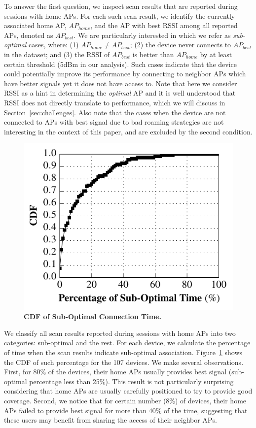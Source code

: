 To answer the first question, we inspect scan results that are reported during
\wifi{} sessions with home APs. For each such scan result, we identify the
currently associated home AP, $AP_{home}$, and the AP with best RSSI among all
reported APs, denoted as $AP_{best}$. We are particularly interested in which we
refer as \textit{sub-optimal} cases, where: (1) $AP_{home} \neq AP_{best}$; (2)
the device never connects to $AP_{best}$ in the dataset; and (3) the RSSI of
$AP_{best}$ is better than $AP_{home}$ by at least certain threshold (5dBm in
our analysis). Such cases indicate that the device could potentially improve its
\wifi{} performance by connecting to neighbor APs which have better signals yet it
does not have access to. Note that here we consider RSSI as a hint in determining the
\textit{optimal} AP and it is well understood that RSSI does not directly translate
to \wifi{} performance, which we will discuss in Section~\ref{sec:challenges}.
Also note that the cases when the device are not connected to APs with best
signal due to bad roaming strategies are not interesting in the context of this
paper, and are excluded by the second condition.

\begin{figure}[t]
  \centering
  \includegraphics[width=\columnwidth]{./figures/HomeAPSessionRSSI.pdf}
  \caption{\textbf{CDF of Sub-Optimal Connection Time.}}
  \label{fig:suboptimal}
\end{figure}

We classify all scan results reported during \wifi{} sessions with home APs into
two categories: sub-optimal and the rest. For each device, we calculate the
percentage of time when the scan results indicate sub-optimal association.
Figure~\ref{fig:suboptimal} shows the CDF of such percentage for 
the 107 devices. We make several observations. First, for 80\% of the devices,
their home APs usually provides best signal (sub-optimal percentage less than
25\%). This result is not particularly surprising considering that home APs are
usually carefully positioned to try to provide good coverage. Second, we notice
that for certain number (8\%) of devices, their home APs failed to provide best
signal for more than 40\% of the time, suggesting that these users may benefit
from sharing the \wifi{} access of their neighbor APs.

